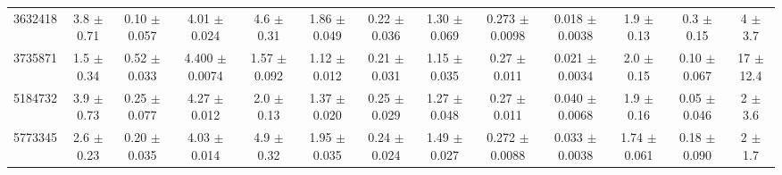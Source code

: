 \begin{table}[H]
\begin{tabular}{c|cccccc|cccccc}
3632418  &        3.8    $\pm$  0.71   &      0.10   $\pm$  0.057  &      4.01   $\pm$  0.024  &      4.6    $\pm$  0.31   &      1.86   $\pm$  0.049  &      0.22   $\pm$  0.036    &        1.30   $\pm$  0.069    &        0.273  $\pm$  0.0098   &        0.018  $\pm$  0.0038   &        1.9    $\pm$  0.13     &        0.3    $\pm$  0.15     &        4      $\pm$  3.7      \\
3735871  &        1.5    $\pm$  0.34   &      0.52   $\pm$  0.033  &      4.400  $\pm$  0.0074 &      1.57   $\pm$  0.092  &      1.12   $\pm$  0.012  &      0.21   $\pm$  0.031    &        1.15   $\pm$  0.035    &        0.27   $\pm$  0.011    &        0.021  $\pm$  0.0034   &        2.0    $\pm$  0.15     &        0.10   $\pm$  0.067    &       17      $\pm$ 12.4      \\
5184732  &        3.9    $\pm$  0.73   &      0.25   $\pm$  0.077  &      4.27   $\pm$  0.012  &      2.0    $\pm$  0.13   &      1.37   $\pm$  0.020  &      0.25   $\pm$  0.029    &        1.27   $\pm$  0.048    &        0.27   $\pm$  0.011    &        0.040  $\pm$  0.0068   &        1.9    $\pm$  0.16     &        0.05   $\pm$  0.046    &        2      $\pm$  3.6      \\
5773345  &        2.6    $\pm$  0.23   &      0.20   $\pm$  0.035  &      4.03   $\pm$  0.014  &      4.9    $\pm$  0.32   &      1.95   $\pm$  0.035  &      0.24   $\pm$  0.024    &        1.49   $\pm$  0.027    &        0.272  $\pm$  0.0088   &        0.033  $\pm$  0.0038   &        1.74   $\pm$  0.061    &        0.18   $\pm$  0.090    &        2      $\pm$  1.7      \\

\end{tabular}
\end{table}
